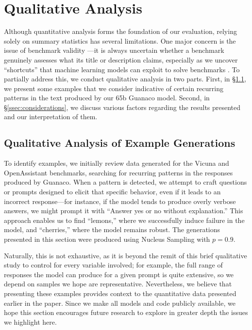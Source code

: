 \section{Qualitative Analysis}

Although quantitative analysis forms the foundation of our evaluation, relying solely on summary statistics has several limitations. One major concern is the issue of benchmark validity \citep{liao2021we}—it is always uncertain whether a benchmark genuinely assesses what its title or description claims, especially as we uncover “shortcuts” that machine learning models can exploit to solve benchmarks \citep{gururangan2018annotation, poliak2018hypothesis}. To partially address this, we conduct qualitative analysis in two parts. First, in \S\ref{ssec:examples}, we present some examples that we consider indicative of certain recurring patterns in the text produced by our 65b {Guanaco} model. Second, in \S\ref{ssec:considerations}, we discuss various factors regarding the results presented and our interpretation of them.

\subsection{Qualitative Analysis of Example Generations}
\label{ssec:examples}

To identify examples, we initially review data generated for the Vicuna and OpenAssistant benchmarks, searching for recurring patterns in the responses produced by {Guanaco}. When a pattern is detected, we attempt to craft questions or prompts designed to elicit that specific behavior, even if it leads to an incorrect response—for instance, if the model tends to produce overly verbose answers, we might prompt it with “Answer yes or no without explanation.” This approach enables us to find “lemons,” where we successfully induce failure in the model, and “cherries,” where the model remains robust. The generations presented in this section were produced using Nucleus Sampling \cite{holtzmancurious} with $p=0.9$.

Naturally, this is not exhaustive, as it is beyond the remit of this brief qualitative study to control for every variable involved; for example, the full range of responses the model can produce for a given prompt is quite extensive, so we depend on samples we hope are representative. Nevertheless, we believe that presenting these examples provides context to the quantitative data presented earlier in the paper. Since we make all models and code publicly available, we hope this section encourages future research to explore in greater depth the issues we highlight here.  
